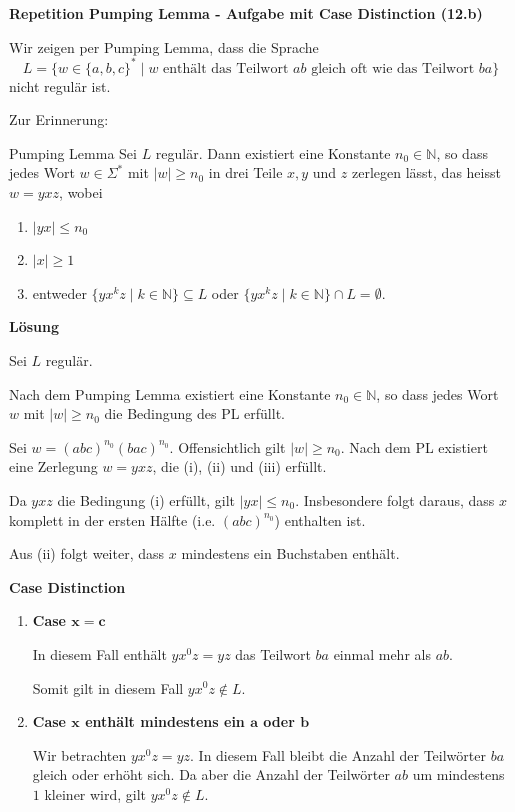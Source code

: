 \documentclass[a4paper, 11pt]{article}
\def\N{\mathbb{N}}
\newcommand\myTitle[1]{{\large \textbf {#1}}}
\begin{document}
    
    \myTitle{Repetition Pumping Lemma - Aufgabe mit Case Distinction (12.b)}

        Wir zeigen per Pumping Lemma, dass die Sprache 
        $$L = \{w \in \{a, b, c\}^* \mid w \text{ enthält das Teilwort $ab$ gleich oft wie das Teilwort $ba$}\}$$
        nicht regulär ist.
    

        Zur Erinnerung:
        \begin{mainbox}{Pumping Lemma}
            Sei $L$ regulär. Dann existiert eine Konstante $n_0 \in \N$, so dass jedes Wort $w \in \Sigma^*$ mit $|w| \geq n_0$ in drei Teile $x, y$ und $z$ zerlegen lässt, das heisst $w = yxz$, wobei
            \begin{enumerate}[label=(\roman*)]
                \item $|yx| \leq n_0$
                \item $|x| \geq 1$
                \item entweder $\{yx^kz \mid k \in \N\} \subseteq L$ oder $\{yx^kz \mid k \in \N\} \cap L = \emptyset$.
            \end{enumerate}
        \end{mainbox}
    
        \textbf{Lösung}
    
        Sei $L$ regulär. 
        
        Nach dem Pumping Lemma existiert eine Konstante $n_0 \in \N$, so dass jedes Wort $w$ mit $|w| \geq n_0$ die Bedingung des PL erfüllt.
        
        Sei $w = (abc)^{n_0}(bac)^{n_0}$. Offensichtlich gilt $|w| \geq n_0$. Nach dem PL existiert eine Zerlegung $w = yxz$, die (i), (ii) und (iii) erfüllt.
        
        Da $yxz$ die Bedingung (i) erfüllt, gilt $|yx| \leq n_0$. Insbesondere folgt daraus, dass $x$ komplett in der ersten Hälfte (i.e. $(abc)^{n_0}$) enthalten ist.
    
        Aus (ii) folgt weiter, dass $x$ mindestens ein Buchstaben enthält.
    
        \textbf{Case Distinction}
        \begin{enumerate}[label=\Roman*.]
            \item \textbf{Case $\mathbf{x = c}$}
            
            In diesem Fall enthält $yx^0z = yz$ das Teilwort $ba$ einmal mehr als $ab$. 
    
            Somit gilt in diesem Fall $yx^0z \notin L$.
            
            \item \textbf{Case $\mathbf{x}$ enthält mindestens ein $\mathbf{a}$ oder $\mathbf{b}$}
            
            Wir betrachten $yx^0z = yz$. 
            In diesem Fall bleibt die Anzahl der Teilwörter $ba$ gleich oder erhöht sich. 
            Da aber die Anzahl der Teilwörter $ab$ um mindestens $1$ kleiner wird, gilt $yx^0z \notin L$.
        \end{enumerate}
        
\end{document}
